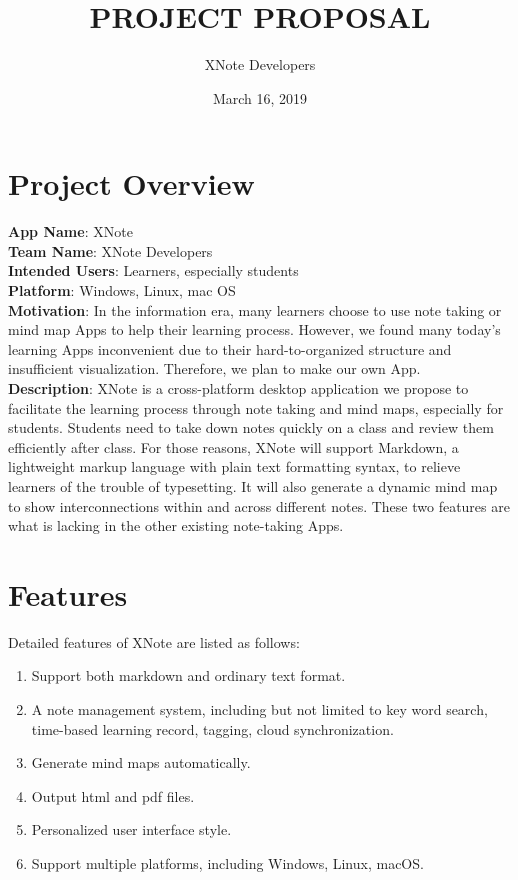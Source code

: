 \documentclass{article}
\title{PROJECT PROPOSAL}
\author{XNote Developers}
\date{March 16, 2019}
\begin{document}
\maketitle

\section{Project Overview}
\noindent\textbf{App Name}: XNote\\
\noindent\textbf{Team Name}: XNote Developers\\
\noindent\textbf{Intended Users}: Learners, especially students\\
\noindent\textbf{Platform}: Windows, Linux, mac OS\\
\noindent\textbf{Motivation}: In the information era, many learners choose to use note taking or mind map Apps to help their learning process. However, we found many today's learning Apps inconvenient due to their hard-to-organized structure and insufficient visualization. Therefore, we plan to make our own App.\\
\noindent\textbf{Description}: XNote is a cross-platform desktop application we propose to facilitate the learning process through note taking and mind maps, especially for students. Students need to take down notes quickly on a class and review them efficiently after class. For those reasons, XNote will support Markdown, a lightweight markup language with plain text formatting syntax, to relieve learners of the trouble of typesetting. It will also generate a dynamic mind map to show interconnections within and across different notes. These two features are what is lacking in the other existing note-taking Apps. 

\section{Features}
Detailed features of XNote are listed as follows:
\begin{enumerate}
	\item Support both markdown and ordinary text format.
	\item A note management system, including but not limited to key word search, time-based learning record, tagging, cloud synchronization.
	\item Generate mind maps automatically.
	\item Output html and pdf files.
	\item Personalized user interface style.
	\item Support multiple platforms, including Windows, Linux, macOS.
\end{enumerate}
\end{document}
